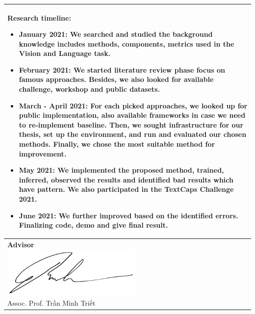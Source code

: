 \begin{longtable}{|p{{{80mm}}}|c|}
{}\\
\hline

\multicolumn{2}{|m{\linewidth}|}{
\textbf{Research timeline}:

\begin{itemize}
    \item January 2021: We searched and studied the background knowledge includes methods, components, metrics used in the Vision and Language task.
    \item February 2021: We started literature review phase focus on famous approaches. Besides, we also looked for available challenge, workshop and public datasets.
    \item March - April 2021: For each picked approaches, we looked up for public implementation, also available frameworks in case we need to re-implement baseline. Then, we sought infrastructure for our thesis, set up the environment, and run and evaluated our chosen methods. Finally, we chose the most suitable method for improvement. 
    \item May 2021: We implemented the proposed method, trained, inferred, observed the results and identified bad results which have pattern. We also participated in the TextCaps Challenge 2021.
    \item June 2021: We further improved based on the identified errors. Finalizing code, demo and give final result.
\end{itemize}


}\\
\hline

\makecell[c]{\textbf{Advisor} \\ 
\includegraphics[height=2.5cm]{resources/signatures/pmkhoi.png} \\ Assoc. Prof. Trần Minh Triết } & 


\end{longtable}
